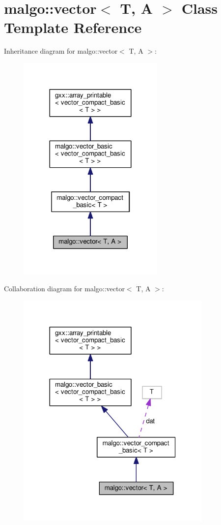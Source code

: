 \hypertarget{classmalgo_1_1vector}{}\section{malgo\+:\+:vector$<$ T, A $>$ Class Template Reference}
\label{classmalgo_1_1vector}


Inheritance diagram for malgo\+:\+:vector$<$ T, A $>$\+:
\nopagebreak
\begin{figure}[H]
\begin{center}
\leavevmode
\includegraphics[width=204pt]{classmalgo_1_1vector__inherit__graph}
\end{center}
\end{figure}


Collaboration diagram for malgo\+:\+:vector$<$ T, A $>$\+:
\nopagebreak
\begin{figure}[H]
\begin{center}
\leavevmode
\includegraphics[width=272pt]{classmalgo_1_1vector__coll__graph}
\end{center}
\end{figure}
